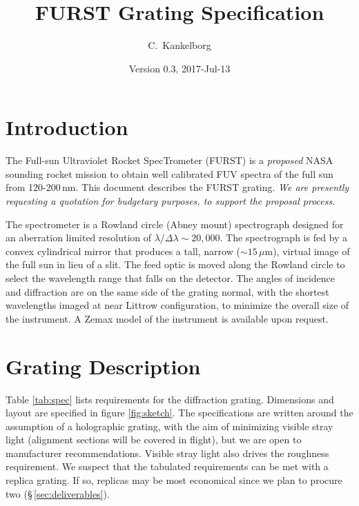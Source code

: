 \documentclass[12pt]{article}
\title{FURST Grating Specification}
\date{Version 0.3, 2017-Jul-13}
\author{C.\ Kankelborg}
\begin{document}
\maketitle

\section{Introduction}

The Full-sun Ultraviolet Rocket SpecTrometer (FURST) is a \emph{proposed} NASA sounding rocket mission to obtain well calibrated FUV spectra of the full sun from 120-200\,nm. This document describes the FURST grating. \emph{We are presently requesting a quotation for budgetary purposes, to support the proposal process.}

The spectrometer is a Rowland circle (Abney mount) spectrograph designed for an aberration limited resolution of $\lambda / \Delta\lambda \sim 20,000$. The spectrograph is fed by a convex cylindrical mirror that produces a tall, narrow ($\sim 15\,\mu$m), virtual image of the full sun in lieu of a slit. The feed optic is moved along the Rowland circle to select the wavelength range that falls on the detector. The angles of incidence and diffraction are on the same side of the grating normal, with the shortest wavelengths imaged at near Littrow configuration, to minimize the overall size of the instrument. A Zemax model of the instrument is available upon request.

\section{Grating Description}
Table \ref{tab:spec} lists requirements for the diffraction grating. Dimensions and layout are specified in figure \ref{fig:sketch}. 
The specifications are written around the assumption of a holographic grating, with the aim of minimizing visible stray light (alignment sections will be covered in flight), but we are open to manufacturer recommendations. Visible stray light also drives the roughness requirement. We suspect that the tabulated requirements can be met with a replica grating. If so, replicas may be most economical since we plan to procure two (\S\,\ref{sec:deliverables}).
\end{document}
